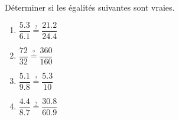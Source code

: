 \begin{exercice*}
    Déterminer si les égalités suivantes sont vraies.
    \begin{enumerate}
        \item $\dfrac{\num{5,3}}{\num{6,1}}\overset{?}{=}\dfrac{\num{21.2}}{\num{24.4}}$\smallskip
        \item $\dfrac{72}{32}\overset{?}{=}\dfrac{360}{160}$\smallskip
        \item $\dfrac{\num{5,1}}{\num{9,8}}\overset{?}{=}\dfrac{\num{5,3}}{10}$\smallskip
        \item $\dfrac{\num{4,4}}{\num{8,7}}\overset{?}{=}\dfrac{\num{30,8}}{\num{60,9}}$
    \end{enumerate}
\end{exercice*}
